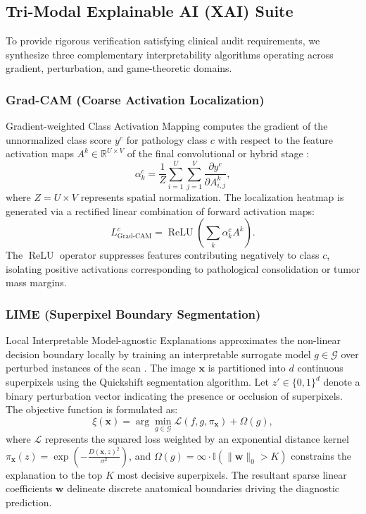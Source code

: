 \documentclass[journal]{IEEEtran}
\begin{document}
\subsection{Tri-Modal Explainable AI (XAI) Suite}
To provide rigorous verification satisfying clinical audit requirements, we synthesize three complementary interpretability algorithms operating across gradient, perturbation, and game-theoretic domains.

\subsubsection{Grad-CAM (Coarse Activation Localization)}
Gradient-weighted Class Activation Mapping computes the gradient of the unnormalized class score $y^c$ for pathology class $c$ with respect to the feature activation maps $A^k \in \mathbb{R}^{U \times V}$ of the final convolutional or hybrid stage \cite{selvaraju2017gradcam}:
\begin{equation}
\alpha_k^c = \frac{1}{Z} \sum_{i=1}^U \sum_{j=1}^V \frac{\partial y^c}{\partial A_{i,j}^k},
\label{eq:gradcam_weights}
\end{equation}
where $Z = U \times V$ represents spatial normalization. The localization heatmap is generated via a rectified linear combination of forward activation maps:
\begin{equation}
L_{\text{Grad-CAM}}^c = \operatorname{ReLU}\left(\sum_{k} \alpha_k^c A^k\right).
\label{eq:gradcam_heatmap}
\end{equation}
The $\operatorname{ReLU}$ operator suppresses features contributing negatively to class $c$, isolating positive activations corresponding to pathological consolidation or tumor mass margins.

\subsubsection{LIME (Superpixel Boundary Segmentation)}
Local Interpretable Model-agnostic Explanations approximates the non-linear decision boundary locally by training an interpretable surrogate model $g \in \mathcal{G}$ over perturbed instances of the scan \cite{ribeiro2016lime}. The image $\mathbf{x}$ is partitioned into $d$ continuous superpixels using the Quickshift segmentation algorithm. Let $z' \in \{0, 1\}^d$ denote a binary perturbation vector indicating the presence or occlusion of superpixels. The objective function is formulated as:
\begin{equation}
\xi(\mathbf{x}) = \arg\min_{g \in \mathcal{G}} \mathcal{L}\left(f, g, \pi_{\mathbf{x}}\right) + \Omega(g),
\label{eq:lime_loss}
\end{equation}
where $\mathcal{L}$ represents the squared loss weighted by an exponential distance kernel $\pi_{\mathbf{x}}(z) = \exp\left(-\frac{D(\mathbf{x}, z)^2}{\sigma^2}\right)$, and $\Omega(g) = \infty \cdot \mathbb{I}(\|\mathbf{w}\|_0 > K)$ constrains the explanation to the top $K$ most decisive superpixels. The resultant sparse linear coefficients $\mathbf{w}$ delineate discrete anatomical boundaries driving the diagnostic prediction.
\end{document}
